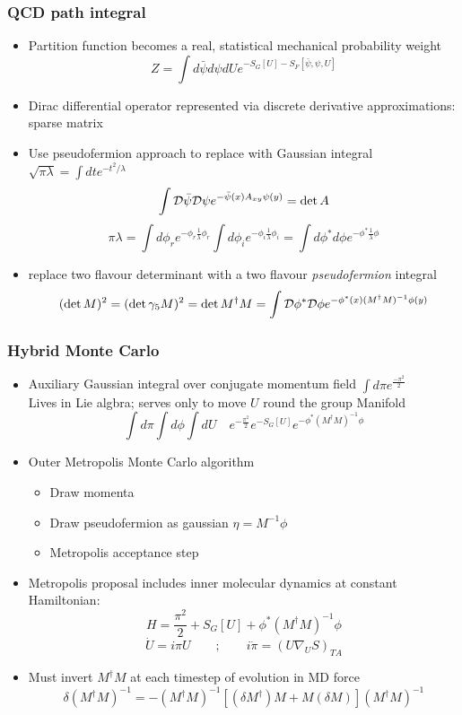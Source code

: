 \documentclass[pdf,ps,8pt]{beamer}
\begin{document}
\begin{frame}[fragile]\small\frametitle{QCD path integral}

\begin{itemize}
\item Partition function becomes a real, statistical mechanical probability weight
  $$Z= \int d\bar\psi d\psi d U e^{-S_G[U]- S_F[\bar\psi,\psi,U]}$$
\item Dirac differential operator represented via discrete derivative approximations: sparse matrix
\item Use pseudofermion approach to replace with Gaussian integral $\sqrt{\pi\lambda} = \int dt e^{-t^2/\lambda}$
$$
\int {\cal D}\bar \psi {\cal D\psi} e^{-\bar\psi(x) A_{xy} \psi(y) } = \det A
$$
$$
\pi \lambda = \int d\phi_r e^{-\phi_r \frac{1}{\lambda}  \phi_r}
              \int d\phi_i e^{-\phi_i \frac{1}{\lambda}  \phi_i} 
              = \int d\phi^\ast d\phi e^{-\phi^\ast \frac{1}{\lambda}  \phi}
$$
\item replace two flavour determinant with a two flavour \emph{pseudofermion} integral
$$
(\det M)^2 = (\det \gamma_5 M)^2 = \det M^\dag M = \int {\cal D}\phi^\ast {\cal D} \phi e^{-\phi^\ast(x) (M^\dag M)^{-1} \phi(y) }
$$
\end{itemize}

\end{frame}

\begin{frame}[fragile]\small\frametitle{Hybrid Monte Carlo}
\begin{itemize}
\item Auxiliary Gaussian integral over conjugate momentum field $\int d\pi e^\frac{-\pi^2}{2}$ \\
  Lives in Lie algbra; serves only to move $U$ round the group Manifold
  $$
  \int d\pi
  \int d \phi
  \int d U \quad
  e^{-\frac{\pi^2}{2}}
  e^{-S_G[U]}
  e^{-\phi^\ast (M^\dag M)^{-1} \phi }
  $$
\item Outer Metropolis Monte Carlo algorithm
  \begin{itemize}
  \item Draw momenta
  \item Draw pseudofermion as gaussian $\eta = M^{-1} \phi$
  \item Metropolis acceptance step
  \end{itemize}
\item Metropolis proposal includes {inner molecular dynamics} at constant Hamiltonian:
  $$
  H= \frac{\pi^2}{2}+S_G[U]+\phi^\ast (M^\dag M)^{-1} \phi
  $$
  $$\dot{U} = i \pi U \quad\quad;\quad\quad i \dot \pi = ( U \nabla_U S)_{TA}$$
\item {\color{red} Must invert $M^\dagger M$ at each timestep of evolution in MD force }
$$\delta (M^\dag M)^{-1} = -  (M^\dag M)^{-1} [(\delta M^\dag) M + M (\delta M) ] (M^\dag M)^{-1}$$
\end{itemize}
\end{frame}
\end{document}
